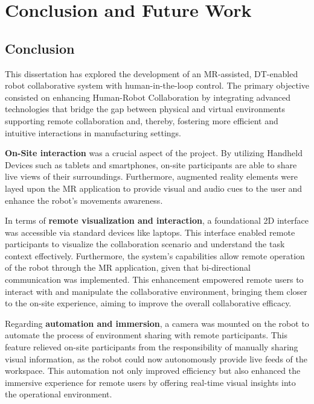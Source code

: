 \chapter{Conclusion and Future Work}%



\section{Conclusion}

This dissertation has explored the development of an \ac{MR}-assisted, \ac{DT}-enabled robot collaborative system with human-in-the-loop control. The primary objective consisted on enhancing Human-Robot Collaboration by integrating advanced technologies that bridge the gap between physical and virtual environments supporting remote collaboration and, thereby, fostering more efficient and intuitive interactions in manufacturing settings.

\textbf{On-Site interaction} was a crucial aspect of the project. By utilizing Handheld Devices such as tablets and smartphones, on-site participants are able to share live views of their surroundings. Furthermore, augmented reality elements were layed upon the \ac{MR} application to provide visual and audio cues to the user and enhance the robot's movements awareness. 

In terms of \textbf{remote visualization and interaction}, a foundational 2D interface was accessible via standard devices like laptops. This interface enabled remote participants to visualize the collaboration scenario and understand the task context effectively. Furthermore, the system's capabilities allow remote operation of the robot through the \ac{MR} application, given that bi-directional communication was implemented. This enhancement empowered remote users to interact with and manipulate the collaborative environment, bringing them closer to the on-site experience, aiming to improve the overall collaborative efficacy.


Regarding \textbf{automation and immersion}, a camera was mounted on the robot to automate the process of environment sharing with remote participants. This feature relieved on-site participants from the responsibility of manually sharing visual information, as the robot could now autonomously provide live feeds of the workspace. This automation not only improved efficiency but also enhanced the immersive experience for remote users by offering real-time visual insights into the operational environment.

